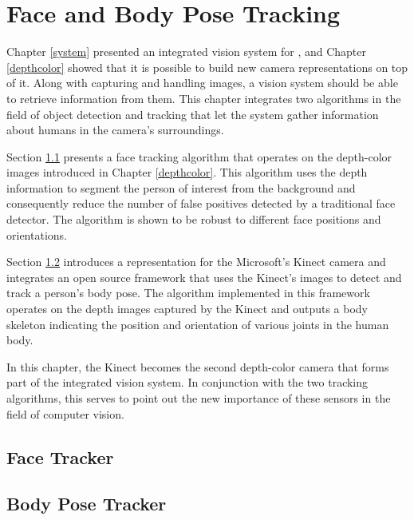 \chapter{Face and Body Pose Tracking} \label{applications}

Chapter \ref{system} presented an integrated vision system for \RD{}, and Chapter \ref{depthcolor} showed 
that it is possible to build new camera representations on top of it. Along with capturing and handling images, 
a vision system should be able to retrieve information from them. This chapter integrates two algorithms in the 
field of object detection and tracking that let the system gather information about humans in the 
camera's surroundings. 

Section \ref{facetracker} presents a face tracking algorithm that operates on the depth-color images introduced 
in Chapter \ref{depthcolor}. This algorithm uses the depth information to segment the person of interest from 
the background and consequently reduce the number of false positives detected by a traditional face detector.
The algorithm is shown to be robust to different face positions and orientations. 

Section \ref{bodyposetracker} introduces a representation for the Microsoft's Kinect camera and integrates an
open source framework that uses the Kinect's images to detect and track a person's body pose. The algorithm 
implemented in this framework operates on the depth images captured by the Kinect and outputs a body 
skeleton indicating the position and orientation of various joints in the human body. 

In this chapter, the Kinect becomes the second depth-color camera that forms part of the integrated vision 
system. In conjunction with the two tracking algorithms, this serves to point out the new importance of these 
sensors in the field of computer vision. 


\section{Face Tracker} \label{facetracker}


\section{Body Pose Tracker} \label{bodyposetracker}
